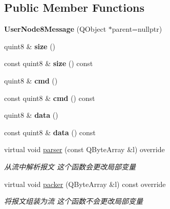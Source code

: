 \subsection*{Public Member Functions}
\begin{DoxyCompactItemize}
\item 
\mbox{\label{class_user_node8_message_acabc4112dd96c83f1c0ede3ac8b0de5d}} 
{\bfseries User\+Node8\+Message} (Q\+Object $\ast$parent=nullptr)
\item 
\mbox{\label{class_user_node8_message_a0f37bac4cb2a0566594c54f24928f141}} 
quint8 \& {\bfseries size} ()
\item 
\mbox{\label{class_user_node8_message_a5c14686f19ebba8d6d859c057eacbb60}} 
const quint8 \& {\bfseries size} () const
\item 
\mbox{\label{class_user_node8_message_af750404c44be85052c9c4c6517a49bf0}} 
quint8 \& {\bfseries cmd} ()
\item 
\mbox{\label{class_user_node8_message_a27d891b5f59c5b351bdc9a291410eb3b}} 
const quint8 \& {\bfseries cmd} () const
\item 
\mbox{\label{class_user_node8_message_aa3b885a01196d3269bcd6a38dbd6d11c}} 
quint8 \& {\bfseries data} ()
\item 
\mbox{\label{class_user_node8_message_afb6e63b41ca9993fd1d2560823ac6839}} 
const quint8 \& {\bfseries data} () const
\item 
virtual void \mbox{\hyperlink{class_user_node8_message_ab81bccac765fc5b01864f4c9fb1aca18}{parser}} (const Q\+Byte\+Array \&l) override
\begin{DoxyCompactList}\small\item\em 从流中解析报文 这个函数会更改局部变量 \end{DoxyCompactList}\item 
virtual void \mbox{\hyperlink{class_user_node8_message_ad68abcd51517e7398ef28acf37eae9eb}{packer}} (Q\+Byte\+Array \&l) const override
\begin{DoxyCompactList}\small\item\em 将报文组装为流 这个函数不会更改局部变量 \end{DoxyCompactList}\end{DoxyCompactItemize}


